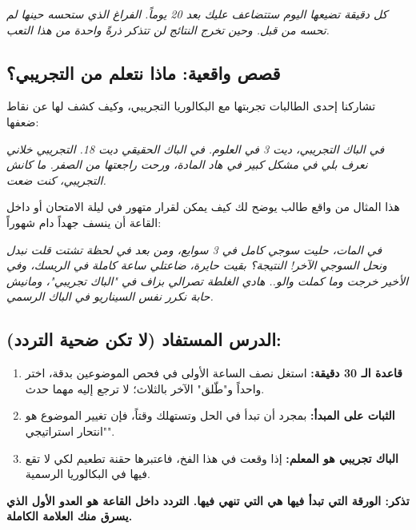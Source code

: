 \documentclass[12pt,a4paper]{book}
\newcommand{\quoteAr}[1]{%
	\begin{myquote}
		\itshape #1
	\end{myquote}
}
\newcommand{\importantAr}[1]{%
	\begin{important}
		\bfseries #1
	\end{important}
}
\begin{document}
	\quoteAr{كل دقيقة تضيعها اليوم ستتضاعف عليك بعد 20 يوماً. الفراغ الذي ستحسه حينها لم تحسه من قبل. وحين تخرج النتائج لن تتذكر ذرةً واحدة من هذا التعب.}
	
	
	\subsection{قصص واقعية: ماذا نتعلم من التجريبي؟}
	
	تشاركنا إحدى الطالبات تجربتها مع البكالوريا التجريبي، وكيف كشف لها عن نقاط ضعفها:
	
	\quoteAr{في الباك التجريبي، ديت 3 في العلوم. في الباك الحقيقي ديت 18. التجريبي خلاني نعرف بلي في مشكل كبير في هاد المادة، ورحت راجعتها من الصفر. ما كانش التجريبي، كنت ضعت.}
	
	هذا المثال من واقع طالب يوضح لك كيف يمكن لقرار متهور في ليلة الامتحان أو داخل القاعة أن ينسف جهداً دام شهوراً:
	
	
	
	\quoteAr{في المات، حليت سوجي كامل في 3 سوايع، ومن بعد في لحظة تشتت قلت نبدل ونحل السوجي الآخر! النتيجة؟ بقيت حايرة، ضاعتلي ساعة كاملة في الريسك، وفي الأخير خرجت وما كملت والو.. هادي الغلطة تصرالي بزاف في "الباك تجريبي"، ومانيش حابة نكرر نفس السيناريو في الباك الرسمي.}
	
	
	
	\subsection*{الدرس المستفاد (لا تكن ضحية التردد):}
	
	\begin{enumerate}
		
		\item \textbf{قاعدة الـ 30 دقيقة:} استغل نصف الساعة الأولى في فحص الموضوعين بدقة، اختر واحداً و"طّلق" الآخر بالثلاث؛ لا ترجع إليه مهما حدث.
		
		\item \textbf{الثبات على المبدأ:} بمجرد أن تبدأ في الحل وتستهلك وقتاً، فإن تغيير الموضوع هو "انتحار استراتيجي".
		
		\item \textbf{الباك تجريبي هو المعلم:} إذا وقعت في هذا الفخ، فاعتبرها حقنة تطعيم لكي لا تقع فيها في البكالوريا الرسمية.
		
	\end{enumerate}
	
	
	
	\importantAr{تذكر: الورقة التي تبدأ فيها هي التي تنهي فيها. التردد داخل القاعة هو العدو الأول الذي يسرق منك العلامة الكاملة.}
\end{document}
